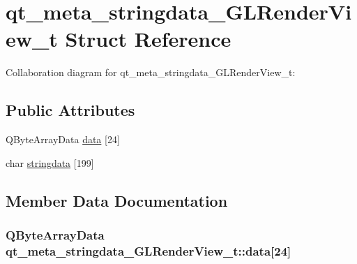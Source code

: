 \hypertarget{structqt__meta__stringdata__GLRenderView__t}{}\section{qt\+\_\+meta\+\_\+stringdata\+\_\+\+G\+L\+Render\+View\+\_\+t Struct Reference}
\label{structqt__meta__stringdata__GLRenderView__t}


Collaboration diagram for qt\+\_\+meta\+\_\+stringdata\+\_\+\+G\+L\+Render\+View\+\_\+t\+:
\subsection*{Public Attributes}
\begin{DoxyCompactItemize}
\item 
Q\+Byte\+Array\+Data \hyperlink{structqt__meta__stringdata__GLRenderView__t_ad7580cbde0af0d5580825156d12df720}{data} \mbox{[}24\mbox{]}
\item 
char \hyperlink{structqt__meta__stringdata__GLRenderView__t_ac7c0a1454bc91573ef78b022640f71a4}{stringdata} \mbox{[}199\mbox{]}
\end{DoxyCompactItemize}


\subsection{Member Data Documentation}
\hypertarget{structqt__meta__stringdata__GLRenderView__t_ad7580cbde0af0d5580825156d12df720}{}
\subsubsection[{data}]{\setlength{\rightskip}{0pt plus 5cm}Q\+Byte\+Array\+Data qt\+\_\+meta\+\_\+stringdata\+\_\+\+G\+L\+Render\+View\+\_\+t\+::data\mbox{[}24\mbox{]}}\label{structqt__meta__stringdata__GLRenderView__t_ad7580cbde0af0d5580825156d12df720}
\hypertarget{structqt__meta__stringdata__GLRenderView__t_ac7c0a1454bc91573ef78b022640f71a4}{}
